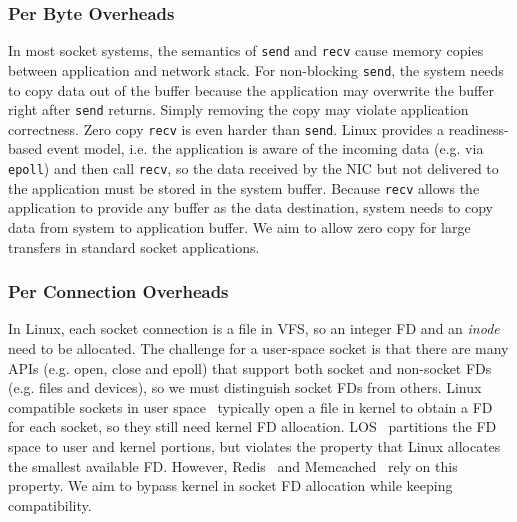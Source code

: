 \subsubsection{Per Byte Overheads}
\label{subsec:per-byte-overhead}
\quad

In most socket systems, the semantics of \texttt{send} and \texttt{recv} cause memory copies between application and network stack. For non-blocking \texttt{send}, the system needs to copy data out of the buffer because the application may overwrite the buffer right after \texttt{send} returns. Simply removing the copy may violate application correctness.
Zero copy \texttt{recv} is even harder than \texttt{send}.
Linux provides a readiness-based event model, i.e. the application is aware of the incoming data (e.g. via \texttt{epoll}) and then call \texttt{recv}, so the data received by the NIC but not delivered to the application must be stored in the system buffer.
Because \texttt{recv} allows the application to provide any buffer as the data destination, system needs to copy data from system to application buffer. 
We aim to allow zero copy for large transfers in standard socket applications.



\subsubsection{Per Connection Overheads}
\label{subsec:per-connection-overhead}
\quad

In Linux, each socket connection is a file in VFS, so an integer FD and an \emph{inode} need to be allocated.
The challenge for a user-space socket is that there are many APIs (e.g. open, close and epoll) that support both socket and non-socket FDs (e.g. files and devices), so we must distinguish socket FDs from others.
Linux compatible sockets in user space~\cite{libvma,rsockets} typically open a file in kernel to obtain a FD for each socket, so they still need kernel FD allocation.
LOS~\cite{huang2017high} partitions the FD space to user and kernel portions, but violates the property that Linux allocates the smallest available FD.
However, Redis~\cite{redis} and Memcached~\cite{memcached} rely on this property.
We aim to bypass kernel in socket FD allocation while keeping compatibility.

